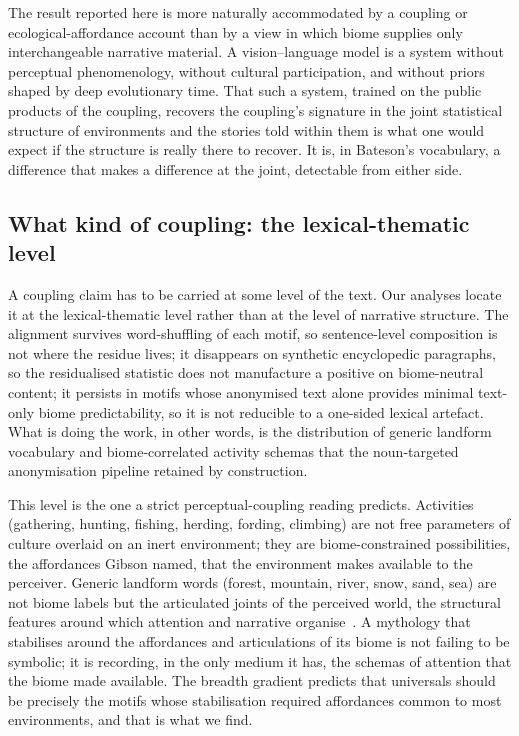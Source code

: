 \documentclass[11pt,a4paper]{article}
\begin{document}
The result reported here is more naturally accommodated by a
coupling or ecological-affordance account than by a view in
which biome supplies only interchangeable narrative material. A
vision--language model is a system without perceptual
phenomenology, without cultural participation, and without
priors shaped by deep evolutionary time. That such a system,
trained on the public products of the coupling, recovers the
coupling's signature in the joint statistical structure of
environments and the stories told within them is what one would
expect if the structure is really there to recover. It is, in
Bateson's vocabulary, a difference that makes a difference at
the joint, detectable from either side.

\subsection*{What kind of coupling: the lexical-thematic level}

A coupling claim has to be carried at some level of the text.
Our analyses locate it at the lexical-thematic level rather than
at the level of narrative structure. The alignment survives
word-shuffling of each motif, so sentence-level composition is
not where the residue lives; it disappears on synthetic
encyclopedic paragraphs, so the residualised statistic does not
manufacture a positive on biome-neutral content; it persists in
motifs whose anonymised text alone provides minimal text-only
biome predictability, so it is not reducible to a one-sided
lexical artefact. What is doing the work, in other words, is the
distribution of generic landform vocabulary and biome-correlated
activity schemas that the noun-targeted anonymisation pipeline
retained by construction.

This level is the one a strict perceptual-coupling reading
predicts. Activities (gathering, hunting, fishing, herding,
fording, climbing) are not free parameters of culture overlaid on
an inert environment; they are biome-constrained possibilities,
the affordances Gibson named, that the environment makes
available to the perceiver. Generic landform words (forest,
mountain, river, snow, sand, sea) are not biome labels but the
articulated joints of the perceived world, the structural
features around which attention and narrative
organise~\citep{ingold2000perception,descola2013beyond}. A
mythology that stabilises around the affordances and
articulations of its biome is not failing to be symbolic; it is
recording, in the only medium it has, the schemas of attention
that the biome made available. The breadth gradient predicts that
universals should be precisely the motifs whose stabilisation
required affordances common to most environments, and that is
what we find.
\end{document}

